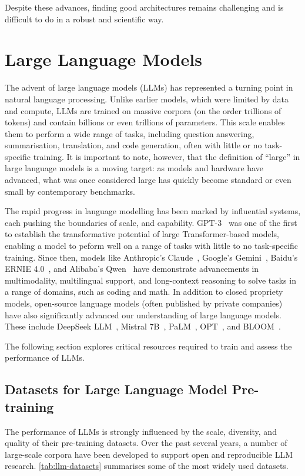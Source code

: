 Despite these advances, finding good architectures remains challenging and is difficult to do in a robust and scientific way.
\section{Large Language Models}

The advent of large language models (LLMs) has represented a turning point in natural language processing. Unlike earlier models, which were limited by data and compute, LLMs are trained on massive corpora (on the order trillions of tokens) and contain billions or even trillions of parameters. This scale enables them to perform a wide range of tasks, including question answering, summarisation, translation, and code generation, often with little or no task-specific training. It is important to note, however, that the definition of ``large'' in large language models is a moving target: as models and hardware have advanced, what was once considered large has quickly become standard or even small by contemporary benchmarks.

The rapid progress in language modelling has been marked by influential systems, each pushing the boundaries of scale, and capability. GPT-3~\citep{brown2020gpt3} was one of the first to establish the transformative potential of large Transformer-based models, enabling a model to peform well on a range of tasks with little to no task-specific training. Since then, models like Anthropic's Claude~\citep{anthropic2024claude3,anthropic2024claude35,anthropic2025claude37}, Google's Gemini~\citep{deepmind2023gemini}, Baidu's ERNIE 4.0~\citep{baidu2023ernie4}, and Alibaba's Qwen~\citep{alibaba2023qwen} have demonstrate advancements in multimodality, multilingual support, and long-context reasoning to solve tasks in a range of domains, such as coding and math. In addition to closed propriety models, open-source language models (often published by private companies) have also significantly advanced our understanding of large language models. These include DeepSeek LLM~\citep{deepseek2024llm}, Mistral 7B~\citep{jiang2023mistral}, PaLM~\citep{chowdhery2023palm}, OPT~\citep{zhang2022opt}, and BLOOM~\citep{le2023bloom}. 

The following section explores critical resources required to train and assess the performance of LLMs.

\subsection{Datasets for Large Language Model Pre-training}
The performance of LLMs is strongly influenced by the scale, diversity, and quality of their pre-training datasets. Over the past several years, a number of large-scale corpora have been developed to support open and reproducible LLM research. \cref{tab:llm-datasets} summarises some of the most widely used datasets.

